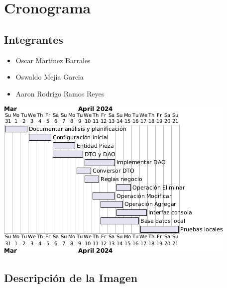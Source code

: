 \section*{\centering Cronograma}

\subsection*{Integrantes}
    \begin{itemize}
        \item Oscar Martinez Barrales
        \item Oswaldo Mejia Garcia
        \item Aaron Rodrigo Ramos Reyes
        \newline
    \end{itemize}


\includegraphics[width=.9\textwidth]{imag/DiagramaCronograma.png}


\subsection*{Descripción de la Imagen}


